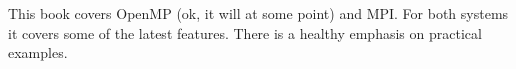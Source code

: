 This book covers OpenMP (ok, it will at some point) and MPI.
For both systems it covers some of the latest features.
There is a healthy emphasis on practical examples.

